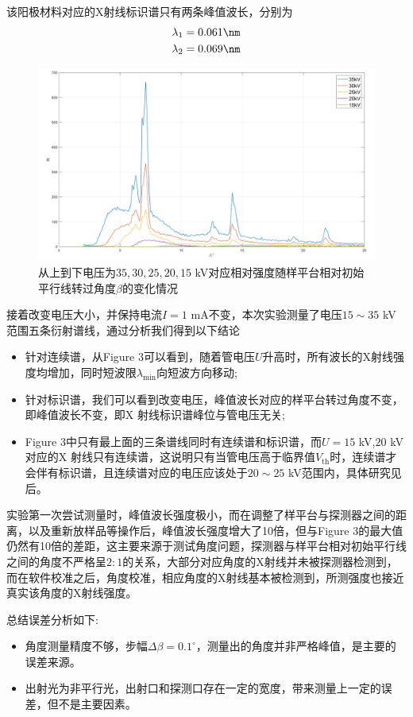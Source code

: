 \documentclass[10.5pt]{article}
\renewcommand{\=}[1]{\stackrel{#1}{=}} %
\theoremstyle{definition}
\theoremstyle{remark}
\begin{document}
	该阳极材料对应的X射线标识谱只有两条峰值波长，分别为
	\begin{align}
		\lambda_1&=0.061\nm\\
		\lambda_2&=0.069\nm
	\end{align}
	\begin{figure}[H]
		\centering
		\includegraphics[scale=0.65]{voltage.png}
		\captionsetup{font=footnotesize}
		\caption{从上到下电压为$35,30,25,20,15$ kV对应相对强度随样平台相对初始平行线转过角度$\beta$的变化情况}
	\end{figure}
	接着改变电压大小，并保持电流$I=1$ mA不变，本次实验测量了电压$15\sim35$ kV范围五条衍射谱线，通过分析我们得到以下结论
	\begin{itemize}
		\item 针对连续谱，从Figure 3可以看到，随着管电压$U$升高时，所有波长的X射线强度均增加，同时短波限$\lambda_{\min}$向短波方向移动;
		\item 针对标识谱，我们可以看到改变电压，峰值波长对应的样平台转过角度不变，即峰值波长不变，即X 射线标识谱峰位与管电压无关;
		\item Figure 3中只有最上面的三条谱线同时有连续谱和标识谱，而$U=15$ kV,$20$ kV对应的X 射线只有连续谱，这说明只有当管电压高于临界值$V_{\text{th}}$时，连续谱才会伴有标识谱，且连续谱对应的电压应该处于$20\sim25$ kV范围内，具体研究见后。
	\end{itemize}
	
	实验第一次尝试测量时，峰值波长强度极小，而在调整了样平台与探测器之间的距离，以及重新放样品等操作后，峰值波长强度增大了10倍，但与Figure 3的最大值仍然有10倍的差距，这主要来源于测试角度问题，探测器与样平台相对初始平行线之间的角度不严格呈$2:1$的关系，大部分对应角度的X射线并未被探测器检测到，而在软件校准之后，角度校准，相应角度的X射线基本被检测到，所测强度也接近真实该角度的X射线强度。
	
	总结误差分析如下:
	\begin{itemize}
		\item 角度测量精度不够，步幅$\Delta\beta=0.1^\circ$，测量出的角度并非严格峰值，是主要的误差来源。
		\item 出射光为非平行光，出射口和探测口存在一定的宽度，带来测量上一定的误差，但不是主要因素。
	\end{itemize}
\end{document}
